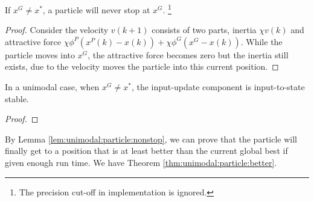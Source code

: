 \begin{mylem}
\label{lem:unimodal:particle:nonstop}
If $ x^{G} \not = x^{*} $, a particle will never stop at $ x^{G} $. 
\footnote{The precision cut-off in implementation is ignored.}
\begin{proof}
Consider the velocity $ v(k+1) $ consists of two parts, inertia $ \chi v(k) $ and attractive force $ \chi \phi^{P} (x^{P}(k) - x(k) ) + \chi \phi^{G} ( x^{G} - x(k) ) $.
While the particle moves into $ x^{G} $, the attractive force becomes zero but the inertia still exists, due to the velocity moves the particle into this current position.
\end{proof} 
\end{mylem}

\begin{mylem}
\label{lem:unimodal:particle:input_iss2}
In a unimodal case, when $ x^{G} \not = x^{*} $, the input-update component is input-to-state stable.
\begin{proof}

\end{proof}
\end{mylem}

By Lemma \ref{lem:unimodal:particle:nonstop}, we can prove that the particle will finally get to a position that is at least better than the current global best if given enough run time.
We have Theorem \ref{thm:unimodal:particle:better}.

